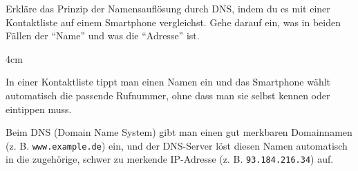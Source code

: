 \question[3]
Erkläre das Prinzip der Namensauflösung durch DNS, indem du es mit einer 
Kontaktliste auf einem Smartphone vergleichst. 
Gehe darauf ein, was in beiden Fällen der \enquote{Name} und was die \enquote{Adresse} ist.

\begin{solutionbox}{4cm}

In einer Kontaktliste tippt man einen Namen ein
und das Smartphone wählt automatisch die passende Rufnummer,
ohne dass man sie selbst kennen oder eintippen muss.

Beim DNS (Domain Name System) gibt man einen gut merkbaren
Domainnamen (z. B. \texttt{www.example.de}) ein, und der DNS-Server
löst diesen Namen automatisch in die zugehörige, schwer zu
merkende IP-Adresse (z. B. \texttt{93.184.216.34}) auf.

\end{solutionbox}